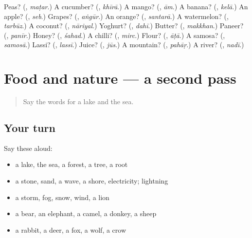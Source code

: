 \begin{tcolorbox}[breakable,colback=teal!4,colframe=teal!35!black,title={Before you move on}]
Peas? (\textbf{}, \emph{maṭar}.) A cucumber? (\textbf{}, \emph{khīrā}.) A mango? (\textbf{}, \emph{ām}.) A banana? (\textbf{}, \emph{kelā}.) An apple? (\textbf{}, \emph{seb}.) Grapes? (\textbf{}, \emph{aṅgūr}.) An orange? (\textbf{}, \emph{santarā}.) A watermelon? (\textbf{}, \emph{tarbūz}.) A coconut? (\textbf{}, \emph{nāriyal}.) Yoghurt? (\textbf{}, \emph{dahī}.) Butter? (\textbf{}, \emph{makkhan}.) Paneer? (\textbf{}, \emph{panīr}.) Honey? (\textbf{}, \emph{śahad}.) A chilli? (\textbf{}, \emph{mirc}.) Flour? (\textbf{}, \emph{āṭā}.) A samosa? (\textbf{}, \emph{samosā}.) Lassi? (\textbf{}, \emph{lassī}.) Juice? (\textbf{}, \emph{jūs}.) A mountain? (\textbf{}, \emph{pahāṛ}.) A river? (\textbf{}, \emph{nadī}.)
\end{tcolorbox}
\section[(dialogue)]{Food and nature — a second pass}

\label{lesson:HI-R147-second-pass-food-and-nature}



\begin{quote}
Say the words for a lake and the sea.
\end{quote}

\subsection*{Your turn}
Say these aloud:

\begin{itemize}
\raggedright
  \item a lake, the sea, a forest, a tree, a root
  \item a stone, sand, a wave, a shore, electricity; lightning
  \item a storm, fog, snow, wind, a lion
  \item a bear, an elephant, a camel, a donkey, a sheep
  \item a rabbit, a deer, a fox, a wolf, a crow
\end{itemize}

